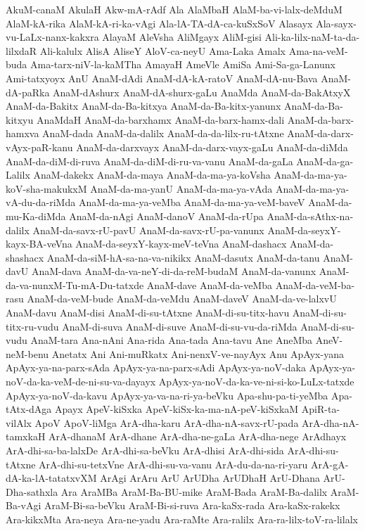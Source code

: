 {AkuM-canaM
AkulaH
Akw-mA-rAdf
Ala
AlaMbaH
AlaM-ba-vi-lalx-deMduM
AlaM-kA-rika
AlaM-kA-ri-ka-vAgi
Ala-lA-TA-dA-ca-kuSxSoV
Alasayx
Ala-sayx-vu-LaLx-nanx-kakxra
AlayaM
AleVsha
AliMgayx
AliM-gisi
Ali-ka-lilx-naM-ta-da-lilxdaR
Ali-kalulx
AlisA
AliseY
AloV-ca-neyU
Ama-Laka
Amalx
Ama-na-veM-buda
Ama-tarx-niV-la-kaMTha
AmayaH
AmeVle
AmiSa
Ami-Sa-ga-Lanunx
Ami-tatxyoyx
AnU
AnaM-dAdi
AnaM-dA-kA-ratoV
AnaM-dA-nu-Bava
AnaM-dA-paRka
AnaM-dAshurx
AnaM-dA-shurx-gaLu
AnaMda
AnaM-da-BakAtxyX
AnaM-da-Bakitx
AnaM-da-Ba-kitxya
AnaM-da-Ba-kitx-yanunx
AnaM-da-Ba-kitxyu
AnaMdaH
AnaM-da-barxhamx
AnaM-da-barx-hamx-dali
AnaM-da-barx-hamxva
AnaM-dada
AnaM-da-dalilx
AnaM-da-da-lilx-ru-tAtxne
AnaM-da-darx-vAyx-paR-kanu
AnaM-da-darxvayx
AnaM-da-darx-vayx-gaLu
AnaM-da-diMda
AnaM-da-diM-di-ruva
AnaM-da-diM-di-ru-va-vanu
AnaM-da-gaLa
AnaM-da-ga-Lalilx
AnaM-dakekx
AnaM-da-maya
AnaM-da-ma-ya-koVsha
AnaM-da-ma-ya-koV-sha-makukxM
AnaM-da-ma-yanU
AnaM-da-ma-ya-vAda
AnaM-da-ma-ya-vA-du-da-riMda
AnaM-da-ma-ya-veMba
AnaM-da-ma-ya-veM-baveV
AnaM-da-mu-Ka-diMda
AnaM-da-nAgi
AnaM-danoV
AnaM-da-rUpa
AnaM-da-sAthx-na-dalilx
AnaM-da-savx-rU-pavU
AnaM-da-savx-rU-pa-vanunx
AnaM-da-seyxY-kayx-BA-veVna
AnaM-da-seyxY-kayx-meV-teVna
AnaM-dashacx
AnaM-da-shashacx
AnaM-da-siM-hA-sa-na-va-nikikx
AnaM-dasutx
AnaM-da-tanu
AnaM-davU
AnaM-dava
AnaM-da-va-neY-di-da-reM-budaM
AnaM-da-vanunx
AnaM-da-va-nunxM-Tu-mA-Du-tatxde
AnaM-dave
AnaM-da-veMba
AnaM-da-veM-ba-rasu
AnaM-da-veM-bude
AnaM-da-veMdu
AnaM-daveV
AnaM-da-ve-lalxvU
AnaM-davu
AnaM-disi
AnaM-di-su-tAtxne
AnaM-di-su-titx-havu
AnaM-di-su-titx-ru-vudu
AnaM-di-suva
AnaM-di-suve
AnaM-di-su-vu-da-riMda
AnaM-di-su-vudu
AnaM-tara
Ana-nAni
Ana-rida
Ana-tada
Ana-tavu
Ane
AneMba
AneV-neM-benu
Anetatx
Ani
Ani-muRkatx
Ani-nenxV-ve-nayAyx
Anu
ApAyx-yana
ApAyx-ya-na-parx-sAda
ApAyx-ya-na-parx-sAdi
ApAyx-ya-noV-daka
ApAyx-ya-noV-da-ka-veM-de-ni-su-va-dayayx
ApAyx-ya-noV-da-ka-ve-ni-si-ko-LuLx-tatxde
ApAyx-ya-noV-da-kavu
ApAyx-ya-va-na-ri-ya-beVku
Apa-shu-pa-ti-yeMba
Apa-tAtx-dAga
Apayx
ApeV-kiSxka
ApeV-kiSx-ka-ma-nA-peV-kiSxkaM
ApiR-ta-vilAlx
ApoV
ApoV-liMga
ArA-dha-karu
ArA-dha-nA-savx-rU-pada
ArA-dha-nA-tamxkaH
ArA-dhanaM
ArA-dhane
ArA-dha-ne-gaLa
ArA-dha-nege
ArAdhayx
ArA-dhi-sa-ba-lalxDe
ArA-dhi-sa-beVku
ArA-dhisi
ArA-dhi-sida
ArA-dhi-su-tAtxne
ArA-dhi-su-tetxVne
ArA-dhi-su-va-vanu
ArA-du-da-na-ri-yaru
ArA-gA-dA-ka-lA-tatatxvXM
ArAgi
ArAru
ArU
ArUDha
ArUDhaH
ArU-Dhana
ArU-Dha-sathxla
Ara
AraMBa
AraM-Ba-BU-mike
AraM-Bada
AraM-Ba-dalilx
AraM-Ba-vAgi
AraM-Bi-sa-beVku
AraM-Bi-si-ruva
Ara-kaSx-rada
Ara-kaSx-rakekx
Ara-kikxMta
Ara-neya
Ara-ne-yadu
Ara-raMte
Ara-ralilx
Ara-ra-lilx-toV-ra-lilalx
}
